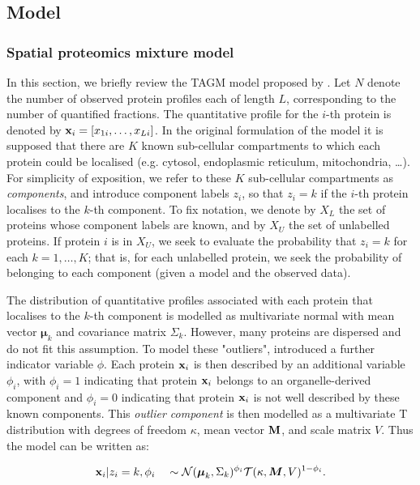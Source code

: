 \documentclass[12pt,english]{article}
\begin{document}
\subsection*{Model}
\subsubsection*{Spatial proteomics mixture model}
In this section, we briefly review the TAGM model proposed by \cite{Crook:2018}. Let $N$ denote the number of observed protein profiles each of length $L$, corresponding to
the number of quantified fractions. The quantitative profile for the $i$-th protein is denoted by ${\bf x}_i = [x_{1i}, \ldots, x_{Li}]$.  In the original formulation of the model it is supposed that there are $K$
known sub-cellular compartments to which each protein could be localised
(e.g. cytosol, endoplasmic reticulum, mitochondria, \ldots). For simplicity of exposition, we refer to these $K$ sub-cellular compartments as {\em
	components}, and introduce component labels $z_i$, so that $z_i = k$
if the $i$-th protein localises to the $k$-th component. To fix notation, we denote by
$X_L$ the set of proteins whose component labels are known, and by
$X_U$ the set of unlabelled proteins.  If protein $i$ is in $X_U$, we seek to evaluate the probability that $z_i = k$ for each $k = 1, \ldots, K$;
that is, for each unlabelled protein, we seek the probability of
belonging to each component (given a model and the observed data).


The distribution of quantitative profiles associated with each
protein that localises to the $k$-th component is modelled as multivariate normal
with mean vector $\boldsymbol{\mu}_k$ and covariance matrix
$\Sigma_k$. However, many proteins are dispersed and do not fit this assumption. To model these "outliers", \cite{Crook:2018} introduced a further indicator variable $\phi$. Each protein ${\bf x}_i$ is then described by an additional variable $\phi_i$, with $\phi_i = 1$ indicating that protein ${\bf x}_i$ belongs to an
organelle-derived component and $\phi_i = 0$ indicating that protein
${\bf x}_i$ is not well described by these known components. This
\textit{outlier component} is then modelled as a multivariate T distribution with
degrees of freedom $\kappa$, mean vector $\bf{M}$, and scale matrix
$V$. Thus the model can be written as:

\begin{align}
{\bf x}_i | z_i = k, \phi_i \quad \sim \mathcal{N}(\boldsymbol{\mu}_k, \Sigma_k)^{\phi_i}\mathcal{T}(\kappa, \boldsymbol{M}, V)^{1 - \phi_i }.
\end{align}
\end{document}
